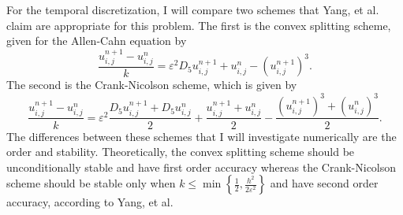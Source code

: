 \documentclass{article}
\begin{document}
	For the temporal discretization, I will compare two schemes that Yang, et {al.} \cite{yang_2018} claim are appropriate for this problem. The first is the convex splitting scheme, given for the Allen-Cahn equation by
	\begin{equation}
		\frac{u^{n+1}_{i,j} - u^n_{i,j}}{k} = \varepsilon^2D_5u^{n+1}_{i,j} + u^n_{i,j} - \left(u^{n+1}_{i,j}\right)^3.
	\end{equation}
	The second is the Crank-Nicolson scheme, which is given by
	\begin{equation}
		\frac{u^{n+1}_{i,j} - u^n_{i,j}}{k} = \varepsilon^2\frac{D_5u^{n+1}_{i,j} + D_5u^n_{i,j}}{2} + \frac{u^{n+1}_{i,j} + u^n_{i,j}}{2} - \frac{\left(u^{n+1}_{i,j}\right)^3 + \left(u^n_{i,j}\right)^3}{2}.
	\end{equation}
	The differences between these schemes that I will investigate numerically are the order and stability. Theoretically, the convex splitting scheme should be unconditionally stable and have first order accuracy whereas the Crank-Nicolson scheme should be stable only when $k \le \min\left\{\frac{1}{2}, \frac{h^2}{2\varepsilon^2}\right\}$ and have second order accuracy, according to Yang, et al. \cite{yang_2018}
	
	
	
\end{document}
